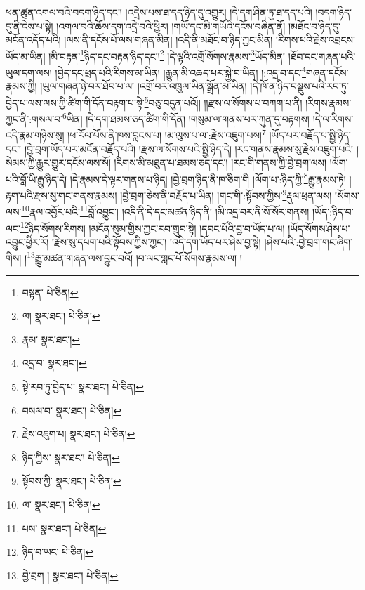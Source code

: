 ཕན་ཚུན་འགལ་བའི་བདག་ཉིད་དང་། །འདྲེས་པས་ཐ་དད་ཉིད་དུ་འགྱུར། །དེ་དག་ཤིན་ཏུ་ཐ་དད་པའི། །བདག་ཉིད་དུ་ནི་ངེས་པ་སྟེ། །འགལ་བའི་ཆོས་དག་འདྲེ་བའི་ཕྱིར། །གཡོ་དང་མི་གཡོའི་དངོས་བཞིན་ནོ། །མཐོང་བ་ཉིད་དུ་མངོན་འདོད་པའི། །ལས་ནི་དངོས་པོ་ལས་གཞན་མིན། །འདི་ནི་མཐོང་བ་ཉིད་ཀྱང་མིན། །རིགས་པའི་རྗེས་འབྲངས་ཡོད་མ་ཡིན། །མི་བརྟན་\footnote{བསྟན་  པེ་ཅིན། }ཉིད་དང་བརྟན་ཉིད་དང་།\footnote{ལ།  སྣར་ཐང་།  པེ་ཅིན། } །དེ་ལྟའི་འགྲོ་སོགས་རྣམས་\footnote{རྣམ་  སྣར་ཐང་། }ཡོད་མིན། །ཐོབ་དང་གཞན་པའི་ཡུལ་དག་ལས། །བྱེད་དང་ཕྲད་པའི་རིགས་མ་ཡིན། །རྒྱུན་མི་འཆད་པར་སྐྱེ་བ་ཡིན། །:འདྲ་བ་དང་\footnote{འདྲ་བ་  སྣར་ཐང་། }གཞན་དངོས་རྣམས་ཀྱི། །ཡུལ་གཞན་ཉེ་བར་ཐོབ་པ་ལ། །འགྲོ་བར་འཁྲུལ་ཡིན་སྒྲོན་མ་ཡིན། །དེ་ཁོ་ན་ཉིད་བསྡུས་པའི་རབ་ཏུ་བྱེད་པ་ལས་ལས་ཀྱི་ཚིག་གི་དོན་བརྟག་པ་སྟེ་\footnote{སྟེ་རབ་ཏུ་བྱེད་པ་  སྣར་ཐང་།  པེ་ཅིན། }བཅུ་བདུན་པའོ།། །།རྫས་ལ་སོགས་པ་བཀག་པ་ནི། །རིགས་རྣམས་ཀྱང་ནི་:གསལ་བ་\footnote{བསལ་བ་  སྣར་ཐང་།  པེ་ཅིན། }ཡིན། །དེ་དག་ཐམས་ཅད་ཚིག་གི་དོན། །གསུམ་ལ་གནས་པར་ཀུན་དུ་བརྟགས། །དེ་ལ་རིགས་འདི་རྣམ་གཉིས་སུ། །ཕ་རོལ་པོས་ནི་ཁས་བླངས་པ། །མ་ལུས་པ་ལ་:རྗེས་འཇུག་པས།\footnote{རྗེས་འཇུག་པ།  སྣར་ཐང་།  པེ་ཅིན། } །ཡོད་པར་བརྗོད་པ་སྤྱི་ཉིད་དང་། །བྱེ་བྲག་ཡོད་པར་མངོན་བརྗོད་པའི། །རྫས་ལ་སོགས་པའི་སྤྱི་ཉིད་དེ། །རང་གནས་རྣམས་སུ་རྗེས་འཇུག་པའི། །སེམས་ཀྱི་རྒྱུར་གྱུར་དངོས་ལས་སོ། །རིགས་མི་མཐུན་པ་ཐམས་ཅད་དང་། །རང་གི་གནས་ཀྱི་བྱེ་བྲག་ལས། །ལོག་པའི་བློ་ཡི་རྒྱུ་ཉིད་དེ། །དེ་རྣམས་དེ་ལྟར་གནས་པ་ཉིད། །བྱེ་བྲག་ཉིད་ནི་ཁ་ཅིག་གི །ལོག་པ་:ཉིད་ཀྱི་\footnote{ཉིད་ཀྱིས་  སྣར་ཐང་།  པེ་ཅིན། }རྒྱུ་རྣམས་ཏེ། །རྟག་པའི་རྫས་སུ་གང་གནས་རྣམས། །བྱེ་བྲག་ཅེས་ནི་བརྗོད་པ་ཡིན། །གང་གི་:སྟོབས་ཀྱིས་\footnote{སྟོབས་ཀྱི་  སྣར་ཐང་།  པེ་ཅིན། }རྡུལ་ཕྲན་ལས། །སོགས་ལས་\footnote{ལ་  སྣར་ཐང་།  པེ་ཅིན། }རྣལ་འབྱོར་པའི་\footnote{པས་  སྣར་ཐང་།  པེ་ཅིན། }བློ་འབྱུང་། །འདི་ནི་དེ་དང་མཚན་ཉིད་ནི། །མི་འདྲ་བར་ནི་སོ་སོར་གནས། །ཡོད་:ཉིད་བ་ལང་\footnote{ཉིད་བ་ཡང་  པེ་ཅིན། }ཉིད་སོགས་རིགས། །མངོན་སུམ་གྱིས་ཀྱང་རབ་གྲུབ་སྟེ། །དབང་པོའི་བྱ་བ་ཡོད་པ་ལ། །ཡོད་སོགས་ཤེས་པ་འབྱུང་ཕྱིར་རོ། །རྗེས་སུ་དཔག་པའི་སྟོབས་ཀྱིས་ཀྱང་། །འདི་དག་ཡོད་པར་ཤེས་བྱ་སྟེ། །ཤེས་པའི་:བྱེ་བྲག་གང་ཞིག་གིས། །\footnote{བྱེ་བྲག །  སྣར་ཐང་།  པེ་ཅིན། }རྒྱུ་མཚན་གཞན་ལས་བྱུང་བའོ། །བ་ལང་གླང་པོ་སོགས་རྣམས་ལ། །
